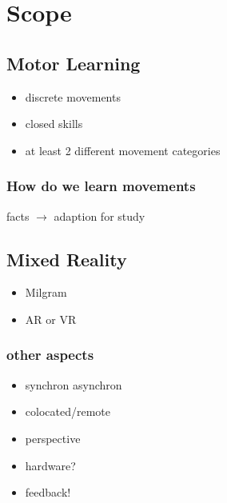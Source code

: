 \chapter{Scope}
\section{Motor Learning}
\begin{itemize}
	\item discrete movements
	\item closed skills
	\item at least 2 different movement categories 
\end{itemize}
\subsection{How do we learn movements}
facts $\rightarrow$ adaption for study
\section{Mixed Reality}
\begin{itemize}
	\item Milgram
	\item AR or VR
\end{itemize}
\subsection{other aspects}
\begin{itemize}
	\item synchron asynchron
	\item colocated/remote
	\item perspective
	\item hardware?
	\item feedback!
	
\end{itemize}

